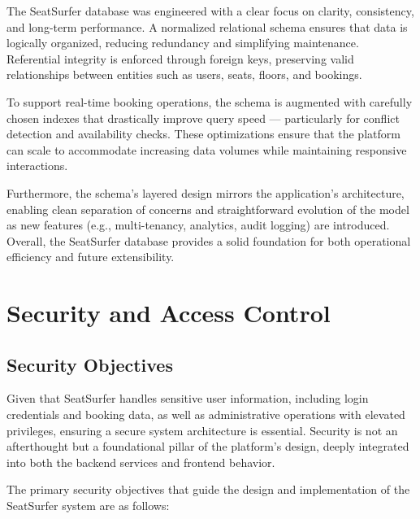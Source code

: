 \documentclass[12pt,a4paper]{report}
\begin{document}
The SeatSurfer database was engineered with a clear focus on clarity, consistency, and long-term performance. A normalized relational schema ensures that data is logically organized, reducing redundancy and simplifying maintenance. Referential integrity is enforced through foreign keys, preserving valid relationships between entities such as users, seats, floors, and bookings.

To support real-time booking operations, the schema is augmented with carefully chosen indexes that drastically improve query speed — particularly for conflict detection and availability checks. These optimizations ensure that the platform can scale to accommodate increasing data volumes while maintaining responsive interactions.

Furthermore, the schema's layered design mirrors the application's architecture, enabling clean separation of concerns and straightforward evolution of the model as new features (e.g., multi-tenancy, analytics, audit logging) are introduced. Overall, the SeatSurfer database provides a solid foundation for both operational efficiency and future extensibility.

\newpage

\chapter{Security and Access Control}

\section{Security Objectives}

Given that SeatSurfer handles sensitive user information, including login credentials and booking data, as well as administrative operations with elevated privileges, ensuring a secure system architecture is essential. Security is not an afterthought but a foundational pillar of the platform’s design, deeply integrated into both the backend services and frontend behavior.

The primary security objectives that guide the design and implementation of the SeatSurfer system are as follows:
\end{document}
